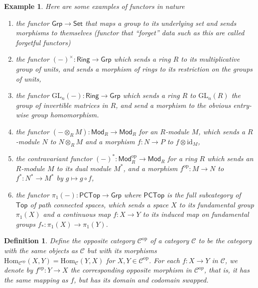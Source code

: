 \documentclass[10pt]{book}
\theoremstyle{bookplain}
\theoremstyle{bookdefinition}
\newtheorem{definition}[theorem]{Definition}
\newtheorem{example}[theorem]{Example}
\theoremstyle{bookremark}
\begin{document}
\begin{example}Here are some examples of functors in nature \label{eg:func}
    \begin{enumerate}
        \item the functor $\mathsf{Grp}\rightarrow \mathsf{Set}$ that maps a group to its underlying set and sends morphisms to themselves (functor that ``forget'' data such as this are called \textit{forgetful functors})
        \item the functor $(-)^\times:\mathsf{Ring}\rightarrow\mathsf{Grp}$ which sends a ring $R$ to its multiplicative group of units, and sends a morphism of rings to its restriction on the groups of units,
        \item the functor $\mathrm{GL}_n(-):\mathsf{Ring}\rightarrow\mathsf{Grp}$ which sends a ring $R$ to $\mathrm{GL}_n(R)$ the group of invertible matrices in $R$, and send a morphism to the obvious entry-wise group homomorphism. 
        \item the functor $(-\otimes_R M):\mathsf{Mod}_R\rightarrow \mathsf{Mod}_R$ for an $R$-module $M$, which sends a $R$-module $N$ to $N\otimes_R M$ and a morphism $f:N\rightarrow P$ to $f\otimes \mathrm{id}_M$,
        \item the contravariant functor $(-)^*:\mathsf{Mod}_R^{\mathrm{op}}\rightarrow \mathsf{Mod}_R$ for a ring $R$ which sends an $R$-module $M$ to its dual module $M^*$, and a morphism $f^{\mathrm{op}}:M\rightarrow N$ to $f^*:N^*\rightarrow M^*$ by $g\mapsto g\circ f$, 
        \item the functor $\pi_1(-):\mathsf{PCTop}\rightarrow\mathsf{Grp}$ where $\mathsf{PCTop}$ is the full subcategory of $\mathsf{Top}$ of path connected spaces, which sends a space $X$ to its fundamental group $\pi_1(X)$ and a continuous map $f:X\rightarrow Y$ to its induced map on fundamental groups $f_*:\pi_1(X)\rightarrow \pi_1(Y)$. 
    \end{enumerate}
\end{example}

\begin{definition}
    Define the \textit{opposite category} $\mathscr{C}^{\mathrm{op}}$ of a category $\mathscr{C}$ to be the category with the same objects as $\mathscr{C}$ but with its morphisms $\mathrm{Hom}_{\mathscr{C}^{\mathrm{op}}}(X,Y)=\mathrm{Hom}_{\mathscr{C}}(Y,X)$ for $X,Y\in \mathscr{C}^{\mathrm{op}}$.
    For each $f:X\rightarrow Y$ in $\mathscr{C}$, we denote by $f^{\mathrm{op}}:Y\rightarrow X$ the corresponding \textit{opposite morphism} in $\mathscr{C}^{\mathrm op}$, that is, it has the same mapping as $f$, but has its domain and codomain swapped. 
\end{definition}
\end{document}
